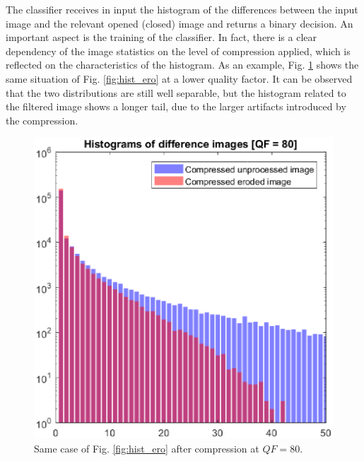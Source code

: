 \documentclass[review]{elsarticle}
\begin{document}
The classifier receives in input the histogram of the differences between the input image and the relevant opened (closed) image and returns a binary decision. An important aspect is the training of the classifier. In fact, there is a clear dependency of the image statistics on the level of compression applied, which is reflected on the characteristics of the histogram. As an example, Fig. \ref{fig:hist_ero_80} shows the same situation of Fig. \ref{fig:hist_ero} at a lower quality factor. It can be observed that the two distributions are still well separable, but the histogram related to the filtered image shows a longer tail, due to the larger artifacts introduced by the compression.

\begin{figure}[t!]%
	\centering
	\includegraphics[scale=0.55]{hist_ero_80.eps}
	\caption{Same case of Fig. \ref{fig:hist_ero} after compression at $QF = 80$.}
	\label{fig:hist_ero_80}%
\end{figure}
\end{document}
